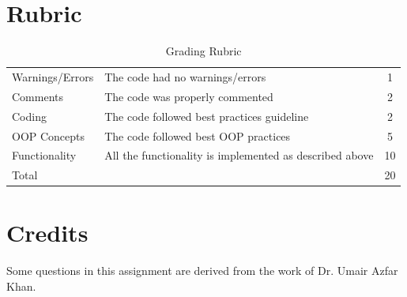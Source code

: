 \documentclass[a4paper,12pt]{article}
\begin{document}
\section{Rubric}
\begin{table}[!h]
	\centering
	\begin{tabular}{llc}
		\toprule
		Warnings/Errors & The code had no warnings/errors                         & 1  \\
		Comments        & The code was properly commented                         & 2  \\
		Coding          & The code followed best practices guideline              & 2  \\
		OOP Concepts    & The code followed best OOP practices                    & 5  \\
		Functionality   & All the functionality is implemented as described above & 10 \\
		\midrule
		Total           &                                                         & 20 \\
		\bottomrule
	\end{tabular}
	\caption{Grading Rubric}
	\label{Grading}
\end{table}
\section{Credits}
Some questions in this assignment are derived from the work of Dr. Umair Azfar Khan.

\newpage
\end{document}
